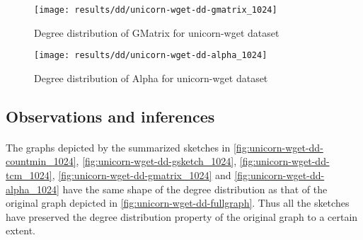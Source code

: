 \begin{figure}[H]
    \centering \texttt{[image: results/dd/unicorn-wget-dd-gmatrix\_1024]}
    \vspace{-0.5cm}
    \caption{Degree distribution of GMatrix for unicorn-wget dataset}
    \label{fig:unicorn-wget-dd-gmatrix_1024}
\end{figure}

\begin{figure}[H]
    \centering \texttt{[image: results/dd/unicorn-wget-dd-alpha\_1024]}
    \vspace{-0.5cm}
    \caption{Degree distribution of Alpha for unicorn-wget dataset}
    \label{fig:unicorn-wget-dd-alpha_1024}
\end{figure}

\subsection*{Observations and inferences}

\paragraph{}
The graphs depicted by the summarized sketches in \autoref{fig:unicorn-wget-dd-countmin_1024}, \autoref{fig:unicorn-wget-dd-gsketch_1024}, \autoref{fig:unicorn-wget-dd-tcm_1024}, \autoref{fig:unicorn-wget-dd-gmatrix_1024} and \autoref{fig:unicorn-wget-dd-alpha_1024} have the same shape of the degree distribution as that of the original graph depicted in \autoref{fig:unicorn-wget-dd-fullgraph}. Thus all the sketches have preserved the degree distribution property of the original graph to a certain extent.